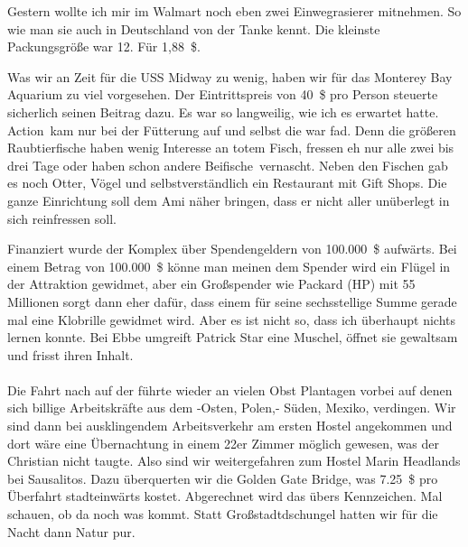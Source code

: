Gestern wollte ich mir im Walmart noch eben zwei Einwegrasierer mitnehmen.
So wie man sie auch in Deutschland von der Tanke kennt.
Die kleinste Packungsgröße war 12.
Für 1,88~\$.

Was wir an Zeit für die USS Midway zu wenig, haben wir für das Monterey Bay Aquarium zu viel vorgesehen.
Der Eintrittspreis von 40~\$ pro Person steuerte sicherlich seinen Beitrag dazu.
Es war so langweilig, wie ich es erwartet hatte.
\glqq Action\grqq \, kam nur bei der Fütterung auf und selbst die war fad.
Denn die größeren Raubtierfische haben wenig Interesse an totem Fisch, fressen eh nur alle zwei bis drei Tage oder haben schon andere \glqq Beifische\grqq \, vernascht.
Neben den Fischen gab es noch Otter, Vögel und selbstverständlich ein Restaurant mit Gift Shops.
Die ganze Einrichtung soll dem Ami näher bringen, dass er nicht aller unüberlegt in sich reinfressen soll.

Finanziert wurde der Komplex über Spendengeldern von 100.000~\$ aufwärts.
Bei einem Betrag von 100.000~\$ könne man meinen dem Spender wird ein Flügel in der Attraktion gewidmet, aber ein Großspender wie Packard (HP) mit 55 Millionen sorgt dann eher dafür, dass einem für seine sechsstellige Summe gerade mal eine Klobrille gewidmet wird.
Aber es ist nicht so, dass ich überhaupt nichts lernen konnte.
Bei Ebbe umgreift Patrick Star eine Muschel, öffnet sie gewaltsam und frisst ihren Inhalt.\\[1em]

\\[1em]

Die Fahrt nach  auf der  führte wieder an vielen Obst Plantagen vorbei auf denen sich billige Arbeitskräfte aus dem -Osten, Polen,- Süden, Mexiko, verdingen.
Wir sind dann bei ausklingendem Arbeitsverkehr am ersten Hostel angekommen und dort wäre eine Übernachtung in einem 22er Zimmer möglich gewesen, was der Christian nicht taugte.
Also sind wir weitergefahren zum Hostel Marin Headlands bei Sausalitos.
Dazu überquerten wir die Golden Gate Bridge, was 7.25~\$ pro Überfahrt stadteinwärts kostet.
Abgerechnet wird das übers Kennzeichen.
Mal schauen, ob da noch was kommt.
Statt Großstadtdschungel hatten wir für die Nacht dann Natur pur.
